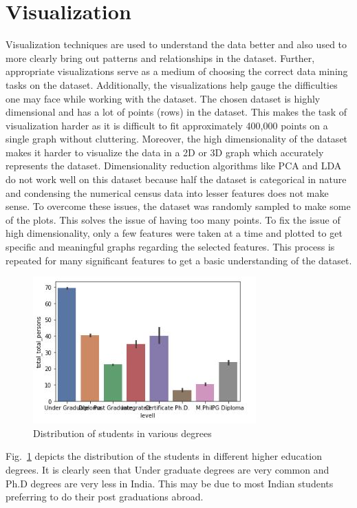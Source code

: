 \section{Visualization}

Visualization techniques are used to understand the data better and also used to more clearly bring out patterns and relationships in the dataset. Further, appropriate visualizations serve as a medium of choosing the correct data mining tasks on the dataset. Additionally, the visualizations help gauge the difficulties one may face while working with the dataset. 
The chosen dataset is highly dimensional and has a lot of points (rows) in the dataset. This makes the task of visualization harder as it is difficult to fit approximately 400,000 points on a single graph without cluttering. Moreover, the high dimensionality of the dataset makes it harder to visualize the data in a 2D or 3D graph which accurately represents the dataset. Dimensionality reduction algorithms like PCA and LDA do not work well on this dataset because half the dataset is categorical in nature and condensing the numerical census data into lesser features does not make sense. 
To overcome these issues, the dataset was randomly sampled to make some of the plots. This solves the issue of having too many points. To fix the issue of high dimensionality, only a few features were taken at a time and plotted to get specific and meaningful graphs regarding the selected features. This process is repeated for many significant features to get a basic understanding of the dataset.

\begin{figure}[h]
\centerline{\includegraphics{figures/degrees.jpg}}
\caption{Distribution of students in various degrees}
\label{deg}
\end{figure}

Fig.~\ref{deg} depicts the distribution of the students in different higher education degrees. It is clearly seen that Under graduate degrees are very common and Ph.D degrees are very less in India. This may be due to most Indian students preferring to do their post graduations abroad. 

